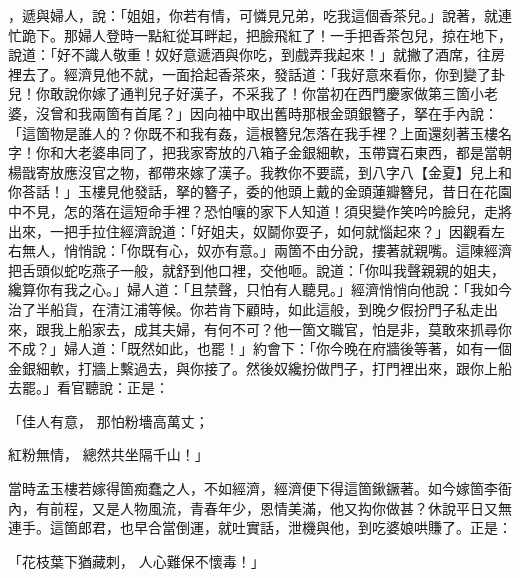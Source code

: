 ，遞與婦人，說：「姐姐，你若有情，可憐見兄弟，吃我這個香茶兒。」說著，就連忙跪下。那婦人登時一點紅從耳畔起，把臉飛紅了！一手把香茶包兒，掠在地下，說道：「好不識人敬重！奴好意遞酒與你吃，到戲弄我起來！」就撇了酒席，往房裡去了。經濟見他不就，一面拾起香茶來，發話道：「我好意來看你，你到變了卦兒！你敢說你嫁了通判兒子好漢子，不采我了！你當初在西門慶家做第三箇小老婆，沒曾和我兩箇有首尾？」因向袖中取出舊時那根金頭銀簪子，拏在手內說：「這箇物是誰人的？你既不和我有姦，這根簪兒怎落在我手裡？上面還刻著玉樓名字！你和大老婆串同了，把我家寄放的八箱子金銀細軟，玉帶寶石東西，都是當朝楊戩寄放應沒官之物，都帶來嫁了漢子。我教你不要謊，到八字八【金夏】兒上和你荅話！」玉樓見他發話，拏的簪子，委的他頭上戴的金頭蓮瓣簪兒，昔日在花園中不見，怎的落在這短命手裡？恐怕嚷的家下人知道！須臾變作笑吟吟臉兒，走將出來，一把手拉住經濟說道：「好姐夫，奴鬬你耍子，如何就惱起來？」因觀看左右無人，悄悄說：「你既有心，奴亦有意。」兩箇不由分說，摟著就親嘴。這陳經濟把舌頭似蛇吃燕子一般，就舒到他口裡，交他咂。說道：「你叫我聲親親的姐夫，纔算你有我之心。」婦人道：「且禁聲，只怕有人聽見。」經濟悄悄向他說：「我如今治了半船貨，在清江浦等候。你若肯下顧時，如此這般，到晚夕假扮門子私走出來，跟我上船家去，成其夫婦，有何不可？他一箇文職官，怕是非，莫敢來抓尋你不成？」婦人道：「既然如此，也罷！」約會下：「你今晚在府牆後等著，如有一個金銀細軟，打牆上繫過去，與你接了。然後奴纔扮做門子，打門裡出來，跟你上船去罷。」看官聽說：正是：

「佳人有意，  那怕粉墻高萬丈；

紅粉無情，  總然共坐隔千山！」

當時孟玉樓若嫁得箇痴蠢之人，不如經濟，經濟便下得這箇鍬鐝著。如今嫁箇李衙內，有前程，又是人物風流，青春年少，恩情美滿，他又抅你做甚？休說平日又無連手。這箇郎君，也早合當倒運，就吐實話，泄機與他，到吃婆娘哄賺了。正是：

「花枝葉下猶藏刺，  人心難保不懷毒！」

